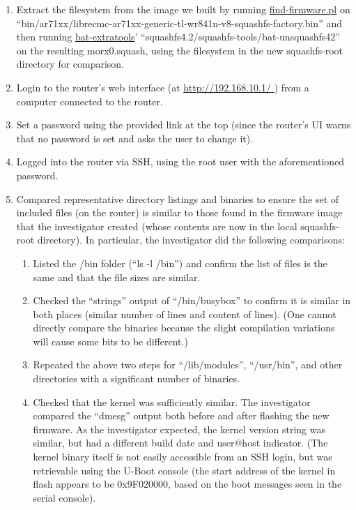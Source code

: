\begin{enumerate}
  
\item Extract the filesystem from the image we built by running
  \href{https://gitorious.org/copyleft-org/gpl-compliance-scripts/source/master:find-firmware.pl}{find-firmware.pl}
  on ``bin/ar71xx/librecmc-ar71xx-generic-tl-wr841n-v8-squashfs-factory.bin''
  and then running
  \href{http://www.binaryanalysis.org/en/content/show/download}{bat-extratools}'
  ``squashfs4.2/squashfs-tools/bat-unsquashfs42'' on the resulting
  morx0.squash, using the filesystem in the new squashfs-root directory for
  comparison.

\item Login to the router's web interface (at \url{http://192.168.10.1/ }) from a computer
  connected to the router.
  
\item Set a password using the provided link at the top (since the router's
  UI warns that no password is set and asks the user to change it).
  
\item Logged into the router via SSH, using the root user with the
  aforementioned password.
  
\item Compared representative directory listings and binaries to ensure the set of
  included files (on the router) is similar to those found in the firmware
  image that the investigator created (whose contents are now in the local squashfs-root directory).  In
  particular, the investigator did the following comparisons:

  \begin{enumerate}
  \item Listed the /bin folder (``ls -l /bin'') and confirm the list of files is the same
    and that the file sizes are similar.
    
  \item Checked the ``strings'' output of ``/bin/busybox'' to confirm it is similar in both
   places (similar number of lines and content of lines).  (One cannot directly
   compare the binaries because the slight compilation variations will cause
   some bits to be different.)
 \item Repeated the above two steps for ``/lib/modules'', ``/usr/bin'', and other directories with
   a significant number of binaries.
   
 \item Checked that the kernel was sufficiently similar.  The investigator
   compared the ``dmesg'' output both before and after flashing the new
   firmware.  As the investigator expected, the kernel version string was
   similar, but had a different build date and user@host indicator.  (The
   kernel binary itself is not easily accessible from an SSH login, but was
   retrievable using the U-Boot console (the start address of the kernel in
   flash appears to be 0x9F020000, based on the boot messages seen in the
   serial console).
  \end{enumerate}
\end{enumerate}

